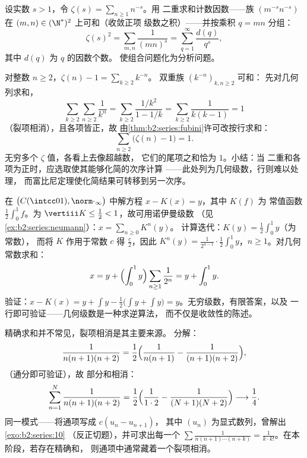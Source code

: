 \begin{example}[一个二重求和的计算]\label{ex:b2:series:doublesum}
设实数 $s > 1$，令 $\zeta(s) = \sum_{n\geq1} n^{-s}$。用
二重求和计数因数——族 $(m^{-s}n^{-s})$ 在
$(m,n) \in (\N^*)^2$ 上可和（收敛正项
级数之积）——并按乘积 $q = mn$ 分组：
\[
\zeta(s)^2 = \sum_{m,n} \frac{1}{(mn)^s}
= \sum_{q=1}^{\infty} \frac{d(q)}{q^s},
\]
其中 $d(q)$ 为 $q$ 的因数个数。
使组合问题化为分析问题。
\end{example}

\begin{example}[用富比尼定理求值：$\sum_n (\zeta(n) - 1) = 1$]\label{ex:b2:series:zetasum}
对整数 $n \geq 2$，$\zeta(n) - 1 = \sum_{k \geq 2} k^{-n}$。
双重族 $(k^{-n})_{k, n \geq 2}$ 可和：
先对几何列求和，
\[
\sum_{k\geq2}\sum_{n\geq2} \frac{1}{k^n}
= \sum_{k\geq2} \frac{1/k^2}{1 - 1/k}
= \sum_{k\geq2} \frac{1}{k(k-1)} = 1
\]
（裂项相消），且各项皆正，故
由\cref{thm:b2:series:fubini}许可改按行求和：
\[
\sum_{n\geq2}\bigl(\zeta(n) - 1\bigr) = 1 .
\]
无穷多个 $\zeta$ 值，各看上去像超越数，
它们的尾项之和恰为 $1$。小结：当
二重和各项为正时，应选取使其能够化简的次序计算
——此处列为几何级数，行则难以处理，
而富比尼定理使化简结果可转移到另一次序。
\end{example}

\begin{example}[几何级数解方程]\label{ex:b2:series:neumannsolve}
在 $\bigl(C(\intcc01),
\norm\cdot_\infty\bigr)$ 中解方程 $x - K(x) = y$，其中 $K(f)$ 为
常值函数 $\frac12\int_0^1 f$。为
$\vertiii K \leq \frac12 < 1$，故可用诺伊曼级数
（见\cref{ex:b2:series:neumann}）：$x = \sum_{n\geq0} K^n(y)$。
计算迭代：$K(y) = \frac12\int_0^1 y$（为常数），
而将 $K$ 作用于常数 $c$ 得 $\frac c2$，因此
$K^n(y) = \frac{1}{2^{n-1}}\cdot\frac12\int_0^1 y$，$n \geq
1$。对几何常数求和：
\[
x = y + \Bigl(\int_0^1 y\Bigr)
\sum_{n\geq1}\frac{1}{2^n} = y + \int_0^1 y .
\]
验证：$x - K(x) = y + \int y - \frac12\bigl(\int y + \int
y\bigr) = y$。无穷级数，有限答案，以及
一行即可验证——几何级数是一种求逆算法，
而不仅是收敛性的陈述。
\end{example}

\begin{example}[利用部分分式裂项相消]\label{ex:b2:series:telescope}
精确求和并不常见，裂项相消是其主要来源。
分解：
\[
\frac{1}{n(n+1)(n+2)}
= \frac{1}{2}\Bigl(\frac{1}{n(n+1)} -
\frac{1}{(n+1)(n+2)}\Bigr),
\]
（通分即可验证），故
部分和相消：
\[
\sum_{n=1}^{N}\frac{1}{n(n+1)(n+2)}
= \frac12\Bigl(\frac{1}{1\cdot2} -
\frac{1}{(N+1)(N+2)}\Bigr)
\longrightarrow \frac14 .
\]
同一模式——将通项写成 $c(u_n - u_{n+1})$，
其中 $(u_n)$ 为显式数列，曾解出\cref{exo:b2:series:10}
（反正切题），并可求出每一个 $\sum\frac{1}{n(n+1)\cdots(n +
k)} = \frac{1}{k\cdot k!}$。在本阶段，若存在精确和，
则通项中通常藏着一个裂项相消。
\end{example}

